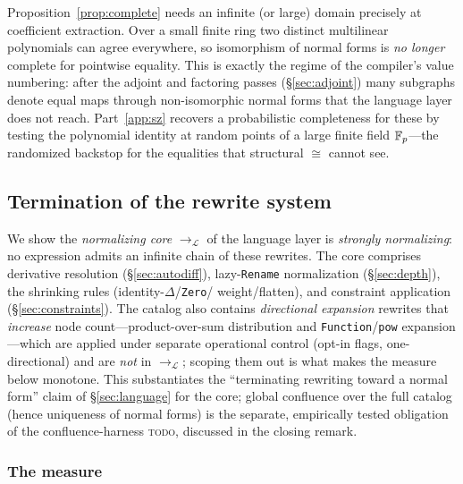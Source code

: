\documentclass[sigplan,10pt,review]{acmart}
\begin{document}
\begin{remark}
Proposition~\ref{prop:complete} needs an infinite (or large) domain
precisely at coefficient extraction. Over a small finite ring two
distinct multilinear polynomials can agree everywhere, so isomorphism of
normal forms is \emph{no longer} complete for pointwise equality. This
is exactly the regime of the compiler's value numbering: after the
adjoint and factoring passes (\S\ref{sec:adjoint}) many subgraphs denote
equal maps through non-isomorphic normal forms that the language layer
does not reach. Part~\ref{app:sz} recovers a probabilistic completeness
for these by testing the polynomial identity at random points of a large
finite field $\mathbb{F}_{p}$---the randomized backstop for the equalities that
structural $\cong$ cannot see.
\end{remark}

\subsection{Termination of the rewrite system}\label{app:term}

We show the \emph{normalizing core} $\rightarrow_{\mathcal L}$ of the
language layer is \emph{strongly normalizing}: no expression admits an
infinite chain of these rewrites. The core comprises derivative
resolution (\S\ref{sec:autodiff}), lazy-\texttt{Rename} normalization
(\S\ref{sec:depth}), the shrinking rules (identity-$\Delta$/\texttt{Zero}/%
weight/flatten), and constraint application (\S\ref{sec:constraints}).
The catalog also contains \emph{directional expansion} rewrites that
\emph{increase} node count---product-over-sum distribution and
\texttt{Function}/\texttt{pow} expansion---which are applied under
separate operational control (opt-in flags, one-directional) and are
\emph{not} in $\rightarrow_{\mathcal L}$; scoping them out is what makes
the measure below monotone. This substantiates the ``terminating
rewriting toward a normal form'' claim of \S\ref{sec:language} for the
core; global confluence over the full catalog (hence uniqueness of
normal forms) is the separate, empirically tested obligation of the
confluence-harness \textsc{todo}, discussed in the closing remark.

\subsubsection*{The measure}
\end{document}
